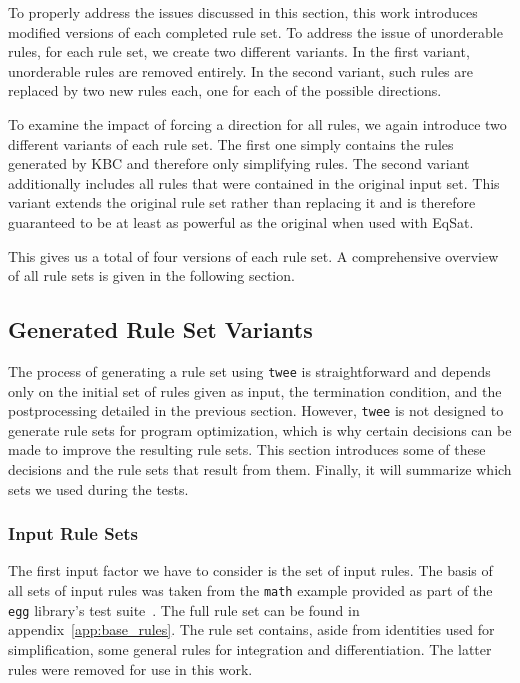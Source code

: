 To properly address the issues discussed in this section, this work introduces modified versions of each completed rule set. To address the issue of unorderable rules, for each rule set, we create two different variants. In the first variant, unorderable rules are removed entirely. In the second variant, such rules are replaced by two new rules each, one for each of the possible directions.

To examine the impact of forcing a direction for all rules, we again introduce two different variants of each rule set. The first one simply contains the rules generated by KBC and therefore only simplifying rules. The second variant additionally includes all rules that were contained in the original input set. This variant extends the original rule set rather than replacing it and is therefore guaranteed to be at least as powerful as the original when used with EqSat. 

This gives us a total of four versions of each rule set. A comprehensive overview of all rule sets is given in the following section.

\subsection{Generated Rule Set Variants}
\label{sec:rulegen-ruletypes}
The process of generating a rule set using \texttt{twee} is straightforward and depends only on the initial set of rules given as input, the termination condition, and the postprocessing detailed in the previous section. However, \texttt{twee} is not designed to generate rule sets for program optimization, which is why certain decisions can be made to improve the resulting rule sets. This section introduces some of these decisions and the rule sets that result from them. Finally, it will summarize which sets we used during the tests.

\subsubsection{Input Rule Sets}
\label{sec:input_rule_sets}
The first input factor we have to consider is the set of input rules. The basis of all sets of input rules was taken from the \texttt{math} example provided as part of the \texttt{egg} library's test suite~\citep{egg_math_rules}. The full rule set can be found in appendix~\ref{app:base_rules}. The rule set contains, aside from identities used for simplification, some general rules for integration and differentiation. The latter rules were removed for use in this work.

